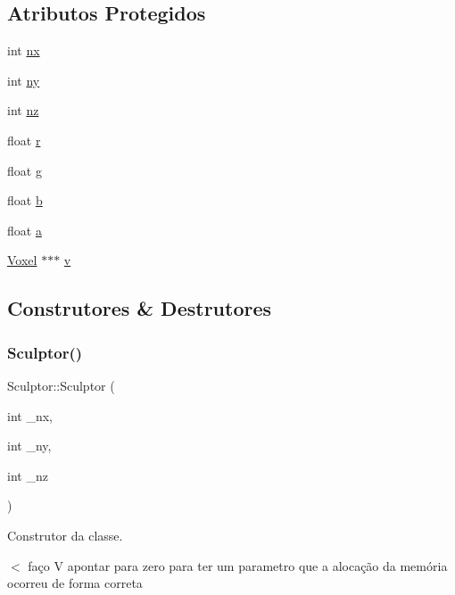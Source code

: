 \subsection*{Atributos Protegidos}
\begin{DoxyCompactItemize}
\item 
int \hyperlink{classSculptor_ad1e32f9042538419a3bc7b376f7813b8}{nx}
\item 
int \hyperlink{classSculptor_a1ce2ff97ec94927928ab3f5ec4ba6761}{ny}
\item 
int \hyperlink{classSculptor_a33204e7df26a7ee4c7192381a24335d3}{nz}
\item 
float \hyperlink{classSculptor_a3f5d2ec3b66d645019b8d81c810a1cd8}{r}
\item 
float \hyperlink{classSculptor_a208c06af69a81a1568df4493868816f1}{g}
\item 
float \hyperlink{classSculptor_a7aafd7305ea634252d8288b60536cd96}{b}
\item 
float \hyperlink{classSculptor_a6fd0157dcf17582f0edd5fddf157604e}{a}
\item 
\hyperlink{structVoxel}{Voxel} $\ast$$\ast$$\ast$ \hyperlink{classSculptor_a4ca53a2f2fbf41ca42dfe729ebe693f1}{v}
\end{DoxyCompactItemize}


\subsection{Construtores \& Destrutores}
\mbox{\label{classSculptor_a014e3ef5517bf0e9d9e14486b6ac6433}} 
\subsubsection{\texorpdfstring{Sculptor()}{Sculptor()}}
{\footnotesize\ttfamily Sculptor\+::\+Sculptor (\begin{DoxyParamCaption}\item[{int}]{\+\_\+nx,  }\item[{int}]{\+\_\+ny,  }\item[{int}]{\+\_\+nz }\end{DoxyParamCaption})}



Construtor da classe. 

$<$ faço V apontar para zero para ter um parametro que a alocação da memória ocorreu de forma correta

